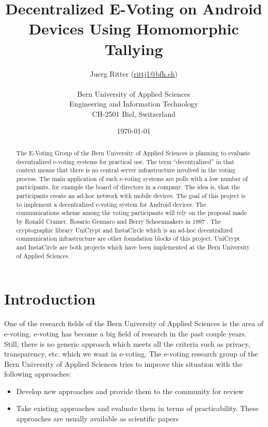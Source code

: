\documentclass[numbers=noenddot, abstract=on, a4paper, headsepline,
footsepline, oneside, draft=off]{scrreprt}
\begin{document}
\title{\bf Decentralized E-Voting on Android Devices Using Homomorphic Tallying}
\subject{Master Thesis}
\author{Juerg Ritter (\url{rittj1@bfh.ch})\\
\\
Bern University of Applied Sciences\\
Engineering and Information Technology\\
CH-2501 Biel, Switzerland\\
}
\date{\today}
\publishers{Advisor:\\
Prof. Dr. Rolf Haenni, Bern University of Applied Sciences\\
\bigskip
Expert:\\
Stephan Neumann, Technical University of Darmstadt}
\maketitle



\begin{abstract}
The E-Voting Group of the Bern University of Applied Sciences is planning to
evaluate decentralized e-voting systems for practical use. The term
``decentralized'' in that context means that there is no central server
infrastructure involved in the voting process. The main application of such
e-voting systems are polls with a low number of participants, for example the
board of directors in a company. The idea is, that the participants create an
ad-hoc network with mobile devices. The goal of this project is to implement a
decentralized e-voting system for Android devices. The communications scheme among
the voting participants will rely on the proposal made by Ronald Cramer,
Rosario Gennaro and Berry Schoenmakers in 1997 \cite{CGS97}. The cryptographic
library UniCrypt and InstaCircle which is an ad-hoc decentralized communication infrastructure are
other foundation blocks of this project. UniCrypt and InstaCircle are both
projects which have been implemented at the Bern University of Applied Sciences.
\end{abstract}

\tableofcontents

\chapter{Introduction}
\label{cha:introduction}
One of the research fields of the Bern University of Applied Sciences is the
area of e-voting. e-voting has become a big field of research in the past couple
years. Still, there is no generic approach which meets all the criteria such as
privacy, transparency, etc. which we want in e-voting. The e-voting research
group of the Bern University of Applied Sciences \cite{www:EVG} tries to
improve this situation with the following approaches:
\begin{itemize}
  \item Develop new approaches and provide them to the community for review
  \item Take existing approaches and evaluate them in terms of practicability.
  These approaches are usually available as scientific papers
\end{itemize}
\end{document}
